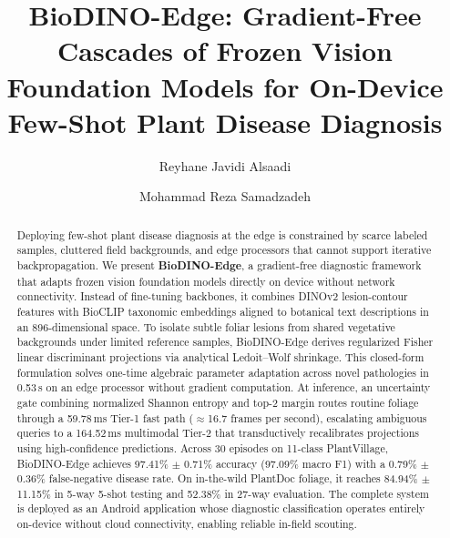 \documentclass[preprint,12pt]{elsarticle}
\begin{document}
\begin{frontmatter}

\title{BioDINO-Edge: Gradient-Free Cascades of Frozen Vision Foundation Models for On-Device Few-Shot Plant Disease Diagnosis}

\author[1]{Reyhane Javidi Alsaadi}

\author[1]{Mohammad Reza Samadzadeh}



\begin{abstract}
Deploying few-shot plant disease diagnosis at the edge is constrained by scarce labeled samples, cluttered field backgrounds, and edge processors that cannot support iterative backpropagation. We present \textbf{BioDINO-Edge}, a gradient-free diagnostic framework that adapts frozen vision foundation models directly on device without network connectivity. Instead of fine-tuning backbones, it combines DINOv2 lesion-contour features with BioCLIP taxonomic embeddings aligned to botanical text descriptions in an 896-dimensional space. To isolate subtle foliar lesions from shared vegetative backgrounds under limited reference samples, BioDINO-Edge derives regularized Fisher linear discriminant projections via analytical Ledoit--Wolf shrinkage. This closed-form formulation solves one-time algebraic parameter adaptation across novel pathologies in 0.53\,s on an edge processor without gradient computation. At inference, an uncertainty gate combining normalized Shannon entropy and top-2 margin routes routine foliage through a 59.78\,ms Tier-1 fast path ($\approx$16.7 frames per second), escalating ambiguous queries to a 164.52\,ms multimodal Tier-2 that transductively recalibrates projections using high-confidence predictions. Across 30 episodes on 11-class PlantVillage, BioDINO-Edge achieves 97.41\% $\pm$ 0.71\% accuracy (97.09\% macro F1) with a 0.79\% $\pm$ 0.36\% false-negative disease rate. On in-the-wild PlantDoc foliage, it reaches 84.94\% $\pm$ 11.15\% in 5-way 5-shot testing and 52.38\% in 27-way evaluation. The complete system is deployed as an Android application whose diagnostic classification operates entirely on-device without cloud connectivity, enabling reliable in-field scouting.
\end{abstract}


\end{frontmatter}
\end{document}
